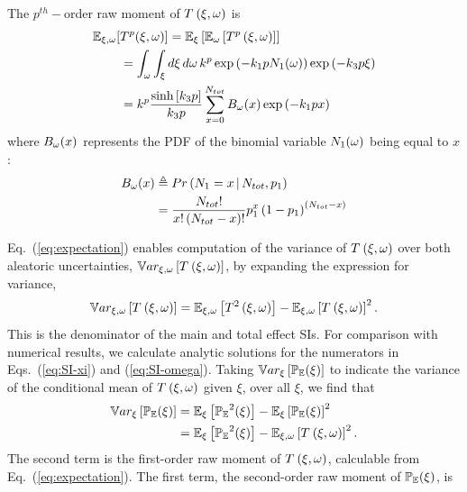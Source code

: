The $p^{th}-$order raw moment of $\T$ is 
\begin{equation}\label{eq:expectation}
\begin{split}
    \mathbb{E}_{\xi,\omega}[&T^p(\xi,\omega)] = \EExi{\EEom{\T[p]}} \\
    &= \int_{\omega} \int_{\xi} d\xi \, d\omega \, 
    k^p \e{-k_1 p \NA} \e{-k_3 p \xi } \\
    &= k^p \frac{\sinhh{k_3 p}}{k_3 p} \sum_{x=0}^{\Nt} \Bom \e{-k_1 p x} 
\end{split}
\end{equation}
where $\Bom$ represents the PDF of the binomial variable $\NA$ being equal to $x$:
\begin{equation}
\begin{split}
 \Bom &\defin Pr\left( N_1 = x \g \Nt, \PA \right) \\
 &= \frac{\Nt!}{x! \left( \Nt - x \right)!} \PA^x \left( 1-\PA\right)^{(\Nt-x)}
\end{split}
\end{equation}


Eq.~(\ref{eq:expectation}) enables computation of the variance of $\T$ over both aleatoric uncertainties, $\Vxo{\T}$, by expanding the expression for variance,
\begin{equation} \label{eq:closed_var}
    \Vxo{\T} = \EExo{\T[2]} - \EExo{\T[]}^2 .
\end{equation}
This is the denominator of the main and total effect SIs. For comparison with numerical results, we calculate analytic solutions for the numerators in Eqs.~(\ref{eq:SI-xi}) and (\ref{eq:SI-omega}). Taking $\Vxi{\PE(\xi)}$ to indicate the variance of the conditional mean of $\T$ given $\xi$, over all $\xi$, we find that
\begin{equation}
\begin{split} \label{eq:closed_var_cond_mean}
    \Vxi{\PE(\xi)} &= \EExi{\PE^2(\xi)} - \EExi{\PE(\xi)}^2 \\
    &= \EExi{\PE^2(\xi)} - \EExo{\T}^2 .
\end{split}
\end{equation}
The second term is the first-order raw moment of $\T$, calculable from Eq.~(\ref{eq:expectation}). The first term, the second-order raw moment of $\PE(\xi)$, is 

